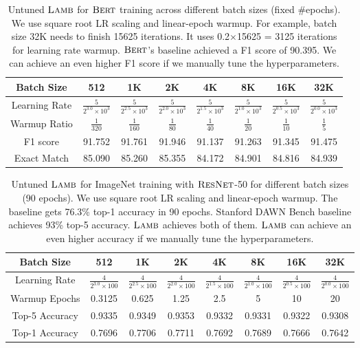 \documentclass{article} \usepackage{iclr2020_conference,times}
\newcommand{\resnet}{\textsc{ResNet}}
\newcommand{\bert}{\textsc{Bert}\xspace}
\newcommand{\lamb}{\textsc{Lamb}}
\begin{document}
\begin{table}[ht]
\renewcommand{\arraystretch}{1.3}
\caption{Untuned $\lamb$ for $\bert$ training across different batch sizes (fixed \#epochs). We use square root LR scaling and linear-epoch warmup. For example, batch size 32K needs to finish 15625 iterations. It uses 0.2$\times$15625 = 3125 iterations for learning rate warmup. $\bert$'s baseline achieved a F1 score of 90.395. We can achieve an even higher F1 score if we manually tune the hyperparameters.}

\centering
\begin{tabular}{|c|c|c|c|c|c|c|c|}
\hline
Batch Size & 512 & 1K & 2K & 4K & 8K & 16K & 32K\\
\hline
\hline
Learning Rate & $\frac{5}{2^{3.0}\times10^{3}}$ & $\frac{5}{2^{2.5}\times10^{3}}$ & $\frac{5}{2^{2.0}\times10^{3}}$ & $\frac{5}{2^{1.5}\times10^{3}}$ & $\frac{5}{2^{1.0}\times10^{3}}$ & $\frac{5}{2^{0.5}\times10^{3}}$ & $\frac{5}{2^{0.0}\times10^{3}}$\\
\hline
Warmup Ratio & $\frac{1}{320}$ & $\frac{1}{160}$ & $\frac{1}{80}$ & $\frac{1}{40}$ & $\frac{1}{20}$ & $\frac{1}{10}$ & $\frac{1}{5}$\\
\hline
F1 score & 91.752 & 91.761 & 91.946 & 91.137 & 91.263 & 91.345 & 91.475 \\
\hline
Exact Match & 85.090 & 85.260 & 85.355 & 84.172 & 84.901 & 84.816 & 84.939 \\
\hline
\end{tabular}
\label{table:hyper_parameters}
\end{table}

\begin{table}[ht]
\renewcommand{\arraystretch}{1.3}
\caption{Untuned $\lamb$ for ImageNet training with $\resnet$-50 for different batch sizes (90 epochs). We use square root LR scaling and linear-epoch warmup. The baseline \cite{goyal2017accurate} gets 76.3\% top-1 accuracy in 90 epochs. Stanford DAWN Bench \citep{coleman2017dawnbench} baseline achieves 93\% top-5 accuracy. $\lamb$ achieves both of them. $\lamb$ can achieve an even higher accuracy if we manually tune the hyperparameters.}
\centering
\begin{tabular}{|c|c|c|c|c|c|c|c|}
\hline
Batch Size & 512 & 1K & 2K & 4K & 8K & 16K & 32K\\
\hline
\hline
Learning Rate & $\frac{4}{2^{3.0}\times100}$ & $\frac{4}{2^{2.5}\times100}$ & $\frac{4}{2^{2.0}\times100}$ & $\frac{4}{2^{1.5}\times100}$ & $\frac{4}{2^{1.0}\times100}$ & $\frac{4}{2^{0.5}\times100}$ & $\frac{4}{2^{0.0}\times100}$\\
\hline
Warmup Epochs & 0.3125 & 0.625 & 1.25 & 2.5 & 5 & 10 & 20\\
\hline
Top-5 Accuracy & 0.9335 & 0.9349 & 0.9353 & 0.9332 & 0.9331 & 0.9322 & 0.9308 \\
\hline
Top-1 Accuracy & 0.7696 & 0.7706 & 0.7711 & 0.7692 & 0.7689 & 0.7666 & 0.7642 \\
\hline
\end{tabular}
\label{table:resnet_hyper_parameters}
\end{table} 
\end{document}
